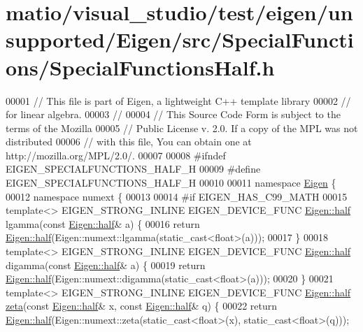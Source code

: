 \hypertarget{matio_2visual__studio_2test_2eigen_2unsupported_2_eigen_2src_2_special_functions_2_special_functions_half_8h_source}{}\section{matio/visual\+\_\+studio/test/eigen/unsupported/\+Eigen/src/\+Special\+Functions/\+Special\+Functions\+Half.h}
\label{matio_2visual__studio_2test_2eigen_2unsupported_2_eigen_2src_2_special_functions_2_special_functions_half_8h_source}

\begin{DoxyCode}
00001 \textcolor{comment}{// This file is part of Eigen, a lightweight C++ template library}
00002 \textcolor{comment}{// for linear algebra.}
00003 \textcolor{comment}{//}
00004 \textcolor{comment}{// This Source Code Form is subject to the terms of the Mozilla}
00005 \textcolor{comment}{// Public License v. 2.0. If a copy of the MPL was not distributed}
00006 \textcolor{comment}{// with this file, You can obtain one at http://mozilla.org/MPL/2.0/.}
00007 
00008 \textcolor{preprocessor}{#ifndef EIGEN\_SPECIALFUNCTIONS\_HALF\_H}
00009 \textcolor{preprocessor}{#define EIGEN\_SPECIALFUNCTIONS\_HALF\_H}
00010 
00011 \textcolor{keyword}{namespace }\hyperlink{namespace_eigen}{Eigen} \{
00012 \textcolor{keyword}{namespace }numext \{
00013 
00014 \textcolor{preprocessor}{#if EIGEN\_HAS\_C99\_MATH}
00015 \textcolor{keyword}{template}<> EIGEN\_STRONG\_INLINE EIGEN\_DEVICE\_FUNC \hyperlink{struct_eigen_1_1half}{Eigen::half} lgamma(\textcolor{keyword}{const} 
      \hyperlink{struct_eigen_1_1half}{Eigen::half}& a) \{
00016   \textcolor{keywordflow}{return} \hyperlink{struct_eigen_1_1half}{Eigen::half}(Eigen::numext::lgamma(static\_cast<float>(a)));
00017 \}
00018 \textcolor{keyword}{template}<> EIGEN\_STRONG\_INLINE EIGEN\_DEVICE\_FUNC \hyperlink{struct_eigen_1_1half}{Eigen::half} digamma(\textcolor{keyword}{const} 
      \hyperlink{struct_eigen_1_1half}{Eigen::half}& a) \{
00019   \textcolor{keywordflow}{return} \hyperlink{struct_eigen_1_1half}{Eigen::half}(Eigen::numext::digamma(static\_cast<float>(a)));
00020 \}
00021 \textcolor{keyword}{template}<> EIGEN\_STRONG\_INLINE EIGEN\_DEVICE\_FUNC \hyperlink{struct_eigen_1_1half}{Eigen::half} \hyperlink{namespace_eigen_af9555e27540da78d2c4bdd17d3b750b1}{zeta}(\textcolor{keyword}{const} 
      \hyperlink{struct_eigen_1_1half}{Eigen::half}& x, \textcolor{keyword}{const} \hyperlink{struct_eigen_1_1half}{Eigen::half}& q) \{
00022   \textcolor{keywordflow}{return} \hyperlink{struct_eigen_1_1half}{Eigen::half}(Eigen::numext::zeta(static\_cast<float>(x), static\_cast<float>(q)));

\end{DoxyCode}
